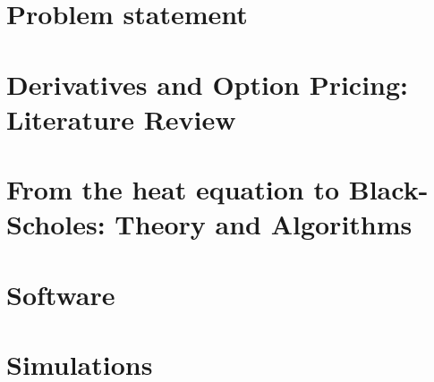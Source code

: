 \documentclass[a4paper,12pt]{report}
\begin{document}
\chapter{Problem statement} \label{sec:problem_statement}



\chapter{Derivatives and Option Pricing: Literature Review}
\label{sec:literature}


\chapter{From the heat equation to Black-Scholes: Theory and Algorithms}\label{sec:theory_and_background}

   
\chapter{Software}\label{sec:software}

%


\chapter{Simulations}\label{sec:simulations}

%
\end{document}
